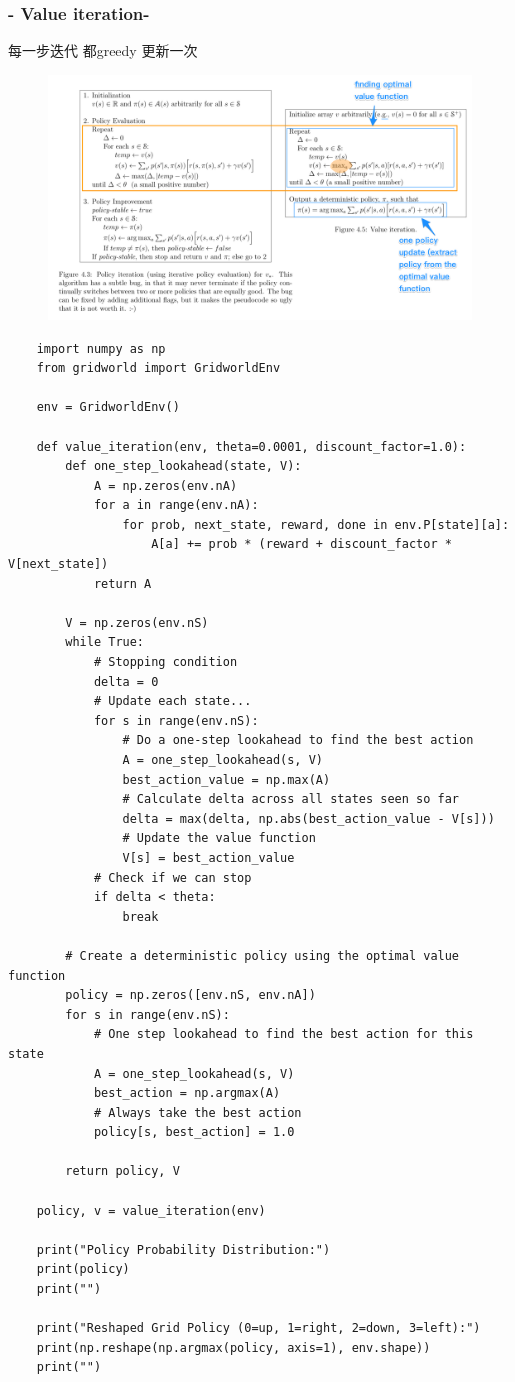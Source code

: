 \documentclass[UTF8,a4paper,12pt]{ctexbook}
\begin{document}
			\subsubsection{- Value iteration- }
				每一步迭代 都greedy 更新一次
				
				\begin{figure}[H]
					\centering
					\includegraphics[width=\linewidth]{valueIteration2}
				\end{figure}
				
				\begin{lstlisting}
	import numpy as np
	from gridworld import GridworldEnv

	env = GridworldEnv()
	 
	def value_iteration(env, theta=0.0001, discount_factor=1.0):
	    def one_step_lookahead(state, V):
	        A = np.zeros(env.nA)
	        for a in range(env.nA):
	            for prob, next_state, reward, done in env.P[state][a]:
	                A[a] += prob * (reward + discount_factor * V[next_state])
	        return A
	     
	    V = np.zeros(env.nS)
	    while True:
	        # Stopping condition
	        delta = 0
	        # Update each state...
	        for s in range(env.nS):
	            # Do a one-step lookahead to find the best action
	            A = one_step_lookahead(s, V)
	            best_action_value = np.max(A)
	            # Calculate delta across all states seen so far
	            delta = max(delta, np.abs(best_action_value - V[s]))
	            # Update the value function
	            V[s] = best_action_value        
	        # Check if we can stop 
	        if delta < theta:
	            break
	     
	    # Create a deterministic policy using the optimal value function
	    policy = np.zeros([env.nS, env.nA])
	    for s in range(env.nS):
	        # One step lookahead to find the best action for this state
	        A = one_step_lookahead(s, V)
	        best_action = np.argmax(A)
	        # Always take the best action
	        policy[s, best_action] = 1.0
	     
	    return policy, V
	 
	policy, v = value_iteration(env)
	 
	print("Policy Probability Distribution:")
	print(policy)
	print("")
	 
	print("Reshaped Grid Policy (0=up, 1=right, 2=down, 3=left):")
	print(np.reshape(np.argmax(policy, axis=1), env.shape))
	print("")				
				\end{lstlisting}
		
\end{document}
